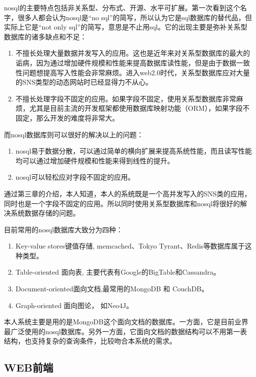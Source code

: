 nosql的主要特点包括非关系型、分布式、开源、水平可扩展。第一次看到这个名字，很多人都会认为nosql\cite{tiwari2011professional,strauch2011nosql,membrey2010definitive}是“no sql”的简写，所以认为它是sql数据库的替代品，但实际上它是“not only sql”的简写，意思是不止用sql。它的出现主要是弥补关系型数据库的诸多缺点和不足：
\begin{enumerate}
\item 不擅长处理大量数据并发写入的应用。这也是近年来对关系型数据库的最大的诟病，因为通过增加硬件规模和性能来提高数据库读性能，但是由于数据一致性问题想提高写入性能会非常麻烦。进入web2.0时代，关系型数据库应对大量的SNS类型的动态网站时已经显得力不从心。
\item 不擅长处理字段不固定的应用。如果字段不固定，使用关系型数据库非常麻烦，尤其是目前主流的开发框架都使用数据库映射功能（ORM），如果字段不固定，那么开发的难度将非常大。
\end{enumerate}
而nosql数据库则可以很好的解决以上的问题：
\begin{enumerate}
\item nosql易于数据分散，可以通过简单的横向扩展来提高系统性能，而且读写性能均可以通过增加硬件规模和性能来得到线性的提升。
\item nosql可以轻松应对字段不固定的应用。
\end{enumerate}
通过第三章的介绍，本人知道，本人的系统既是一个高并发写入的SNS类的应用，同时也是一个字段不固定的应用。所以同时使用关系型数据库和nosql将很好的解决系统数据存储的问题。


目前常用的nosql数据库大致分为四种：
\begin{enumerate}
\item Key-value stores键值存储, memcached、Tokyo Tyrant、Redis等数据库属于这种类型。
\item Table-oriented 面向表, 主要代表有Google的BigTable和Cassandra。
\item Document-oriented面向文档,最常用的MongoDB 和 CouchDB。
\item Graph-oriented 面向图论， 如Neo4J。
\end{enumerate}
本人系统主要是用的是MongoDB\cite{banker2011mongodb,chodorow2010mongodb,wei2011using}这个面向文档的数据库。一方面，它是目前业界最广泛使用的nosql数据库。另外一方面，它面向文档的数据结构可以不用第一表结构，也支持复杂的查询条件，比较吻合本系统的需求。

\subsection{WEB前端}
\label{sec:webui}

